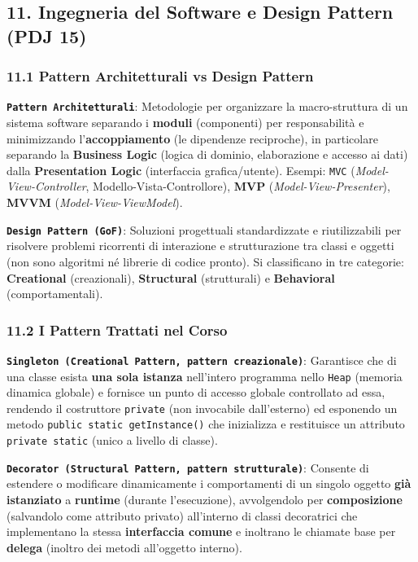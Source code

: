 \subsection{11. Ingegneria del Software e Design Pattern (PDJ 15)}\label{11-ingegneria-del-software-e-design-pattern-pdj-15}

\subsubsection{11.1 Pattern Architetturali vs Design Pattern}\label{11-1-pattern-architetturali-vs-design-pattern}

\textbf{\texttt{Pattern Architetturali}}: Metodologie per organizzare la macro-struttura di un sistema software separando i \textbf{moduli} (componenti) per responsabilità e minimizzando l'\textbf{accoppiamento} (le dipendenze reciproche), in particolare separando la \textbf{Business Logic} (logica di dominio, elaborazione e accesso ai dati) dalla \textbf{Presentation Logic} (interfaccia grafica/utente). Esempi: \texttt{MVC} (\emph{Model-View-Controller}, Modello-Vista-Controllore), \textbf{MVP} (\emph{Model-View-Presenter}), \textbf{MVVM} (\emph{Model-View-ViewModel}).

\textbf{\texttt{Design Pattern (GoF)}}: Soluzioni progettuali standardizzate e riutilizzabili per risolvere problemi ricorrenti di interazione e strutturazione tra classi e oggetti (non sono algoritmi né librerie di codice pronto). Si classificano in tre categorie: \textbf{Creational} (creazionali), \textbf{Structural} (strutturali) e \textbf{Behavioral} (comportamentali).

\subsubsection{11.2 I Pattern Trattati nel Corso}\label{11-2-i-pattern-trattati-nel-corso}

\textbf{\texttt{Singleton (Creational Pattern, pattern creazionale)}}: Garantisce che di una classe esista \textbf{una sola istanza} nell'intero programma nello \texttt{Heap} (memoria dinamica globale) e fornisce un punto di accesso globale controllato ad essa, rendendo il costruttore \texttt{private} (non invocabile dall'esterno) ed esponendo un metodo \texttt{public static getInstance()} che inizializza e restituisce un attributo \texttt{private static} (unico a livello di classe).

\textbf{\texttt{Decorator (Structural Pattern, pattern strutturale)}}: Consente di estendere o modificare dinamicamente i comportamenti di un singolo oggetto \textbf{già istanziato} a \textbf{runtime} (durante l'esecuzione), avvolgendolo per \textbf{composizione} (salvandolo come attributo privato) all'interno di classi decoratrici che implementano la stessa \textbf{interfaccia comune} e inoltrano le chiamate base per \textbf{delega} (inoltro dei metodi all'oggetto interno).


